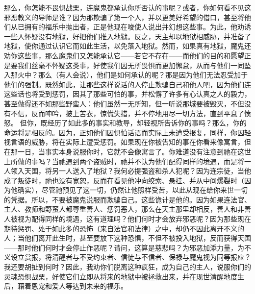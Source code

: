 那么，你怎能不畏惧战栗，连魔鬼都承认你所否认的事呢？或者，你如何看不见这邪恶教义的导师是谁？因为那欺骗了第一个人，并以更美好希望的借口，甚至将他们从已拥有的福乐中抛出者，正是他现在唆使人说出并幻想这些事。为此，他劝诱一些人怀疑没有地狱，好把他们推入地狱。反之，天主却以地狱相威胁，并准备了地狱，使你通过认识它而如此生活，以免落入地狱。然而，如果真有地狱，魔鬼还劝你这些事，那么魔鬼们又怎能承认它——若它不存在——而他们的目的和愿望正是要我们丝毫不怀疑这类事，好使我们因无所畏惧而更加懈怠，从而与他们一同坠入那火中？那么（有人会说），他们是如何承认的呢？那是因为他们无法忍受加于他们的强制。既然如此，让那些这样说话的人停止欺骗自己和他人吧，因为他们连这些话也将受到惩罚，因其了那些可怕的事，并松懈了许多有心认真之人的毅力，甚至做得还不如那些野蛮人：他们虽然一无所知，但一听说那城要被毁灭，不但没有不信，反而呻吟，披上苦衣，惊慌失措，并不停地用尽一切方法，直到平息了愤怒。 但你，既经历了如此多的事实和教导，却轻视所告诉你的事吗？那么，你的命运将是相反的。因为，正如他们因惧怕话语而实际上未遭受报复，同样，你因轻视言语的威胁，将在实际上遭受惩罚。如果现在你被告知的事在你看来像寓言，但在那一日，当事实本身说服你时，它就不会像寓言了。你难道没有注意到祂在这世上所做的事吗？当祂遇到两个盗贼时，祂并不认为他们配得同样的境遇，而是将一人领入天国，将另一人送入了地狱？我何必提强盗和杀人犯呢？因为连宗徒，当他成了叛徒时，祂也没有宽恕，反而在看见他冲向绞索、悬挂、并从中间爆裂时（因为他确实），尽管祂预见了这一切，仍然让他照样受苦，以此从现在给你来世一切的凭据。所以，不要被魔鬼说服而欺骗自己。这些诡计是他的。因为如果连法官、主人、教师和野蛮人都尊重善人、惩罚恶人，那么在天主那里却相反，善人和非善人被视为配得同样的境遇，这有道理吗？他们何时才会放弃邪恶呢？因为那些现在期待惩罚、处于如此多的恐怖（来自法官和法律）之中，却仍不因此离开不义的人；当他们离开此生时，甚至要放下这种恐惧，不但不被投入地狱，反而获得天国——那时他们何时才会停止作恶呢？请问，这算是慈悲吗？为邪恶加添力量，为不义设立赏报，将清醒者与不受约束者、信徒与不信者、保禄与魔鬼视为同等报应？我还要胡扯到何时？因此，我劝你们脱离这种疯狂，成为自己的主人，说服你们的灵魂恐惧战栗，好使它们立即从将来的地狱中被拯救出来，并在现世清醒地度生后，藉着恩宠和爱人等达到未来的福乐。\par



